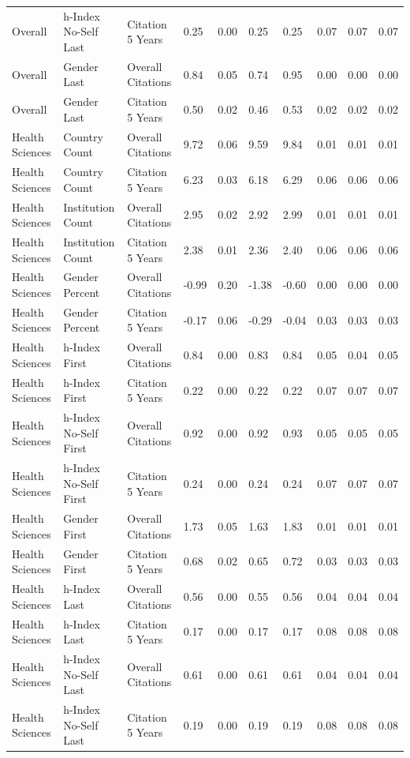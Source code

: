 \documentclass[
  man,floatsintext]{apa6}
\begin{document}
\begin{table}[tbp]
\begin{center}
\begin{threeparttable}
{\begin{tabular}{llllllllll}
Overall & h-Index No-Self Last & Citation 5 Years & 0.25 & 0.00 & 0.25 & 0.25 & 0.07 & 0.07 & 0.07\\
Overall & Gender Last & Overall Citations & 0.84 & 0.05 & 0.74 & 0.95 & 0.00 & 0.00 & 0.00\\
Overall & Gender Last & Citation 5 Years & 0.50 & 0.02 & 0.46 & 0.53 & 0.02 & 0.02 & 0.02\\
Health Sciences & Country Count & Overall Citations & 9.72 & 0.06 & 9.59 & 9.84 & 0.01 & 0.01 & 0.01\\
Health Sciences & Country Count & Citation 5 Years & 6.23 & 0.03 & 6.18 & 6.29 & 0.06 & 0.06 & 0.06\\
Health Sciences & Institution Count & Overall Citations & 2.95 & 0.02 & 2.92 & 2.99 & 0.01 & 0.01 & 0.01\\
Health Sciences & Institution Count & Citation 5 Years & 2.38 & 0.01 & 2.36 & 2.40 & 0.06 & 0.06 & 0.06\\
Health Sciences & Gender Percent & Overall Citations & -0.99 & 0.20 & -1.38 & -0.60 & 0.00 & 0.00 & 0.00\\
Health Sciences & Gender Percent & Citation 5 Years & -0.17 & 0.06 & -0.29 & -0.04 & 0.03 & 0.03 & 0.03\\
Health Sciences & h-Index First & Overall Citations & 0.84 & 0.00 & 0.83 & 0.84 & 0.05 & 0.04 & 0.05\\
Health Sciences & h-Index First & Citation 5 Years & 0.22 & 0.00 & 0.22 & 0.22 & 0.07 & 0.07 & 0.07\\
Health Sciences & h-Index No-Self First & Overall Citations & 0.92 & 0.00 & 0.92 & 0.93 & 0.05 & 0.05 & 0.05\\
Health Sciences & h-Index No-Self First & Citation 5 Years & 0.24 & 0.00 & 0.24 & 0.24 & 0.07 & 0.07 & 0.07\\
Health Sciences & Gender First & Overall Citations & 1.73 & 0.05 & 1.63 & 1.83 & 0.01 & 0.01 & 0.01\\
Health Sciences & Gender First & Citation 5 Years & 0.68 & 0.02 & 0.65 & 0.72 & 0.03 & 0.03 & 0.03\\
Health Sciences & h-Index Last & Overall Citations & 0.56 & 0.00 & 0.55 & 0.56 & 0.04 & 0.04 & 0.04\\
Health Sciences & h-Index Last & Citation 5 Years & 0.17 & 0.00 & 0.17 & 0.17 & 0.08 & 0.08 & 0.08\\
Health Sciences & h-Index No-Self Last & Overall Citations & 0.61 & 0.00 & 0.61 & 0.61 & 0.04 & 0.04 & 0.04\\
Health Sciences & h-Index No-Self Last & Citation 5 Years & 0.19 & 0.00 & 0.19 & 0.19 & 0.08 & 0.08 & 0.08\\

\end{tabular}}
\end{threeparttable}
\end{center}
\end{table}
\end{document}

